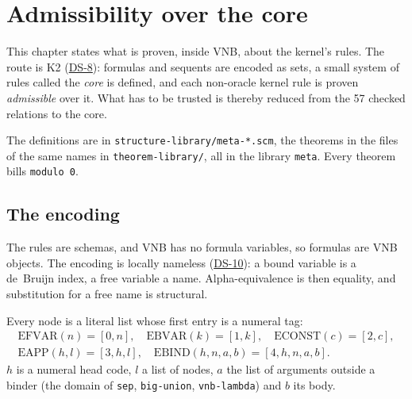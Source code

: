 \providecommand{\DS}[1]{\hyperref[ds:#1]{DS-#1}}
\providecommand{\VNBfig}[3]{\[\frac{\displaystyle #2}{\displaystyle #3}\;\;\mbox{\texttt{#1}}\]}
\providecommand{\VNBfigS}[3]{\[\frac{\displaystyle\begin{array}{c}#2\end{array}}{\displaystyle #3}\;\;\mbox{\texttt{#1}}\]}
\providecommand{\VNBnohyp}{\phantom{\Gamma}}
\providecommand{\FV}{\mathrm{FV}}
\providecommand{\Rl}[2]{$\frac{#1}{#2}$}
\providecommand{\Sq}{\Rightarrow}

\chapter{Admissibility over the core}
\label{ch:meta-k2}

This chapter states what is proven, inside VNB, about the kernel's
rules.  The route is K2 (\DS{8}): formulas and sequents are encoded as
sets, a small system of rules called the \emph{core} is defined, and each
non-oracle kernel rule is proven \emph{admissible} over it.  What has to
be trusted is thereby reduced from the 57 checked relations to the core.

The definitions are in \texttt{structure-library/meta-*.scm}, the
theorems in the files of the same names in \texttt{theorem-library/},
all in the library \texttt{meta}.  Every theorem bills
\texttt{modulo 0}.

\section{The encoding}\label{sec:meta-encoding}

The rules are schemas, and VNB has no formula variables, so formulas
are VNB objects.  The encoding is locally nameless (\DS{10}): a bound
variable is a de~Bruijn index, a free variable a name.
Alpha-equivalence is then equality, and substitution for a free name is
structural.

Every node is a literal list whose first entry is a numeral tag:
\[
\begin{gathered}
\mathrm{EFVAR}(n)=[0,n],\quad \mathrm{EBVAR}(k)=[1,k],\quad
\mathrm{ECONST}(c)=[2,c],\\
\mathrm{EAPP}(h,l)=[3,h,l],\quad \mathrm{EBIND}(h,n,a,b)=[4,h,n,a,b].
\end{gathered}
\]
$h$ is a numeral head code, $l$ a list of nodes, $a$ the list of
arguments outside a binder (the domain of \texttt{sep},
\texttt{big-union}, \texttt{vnb-lambda}) and $b$ its body.

